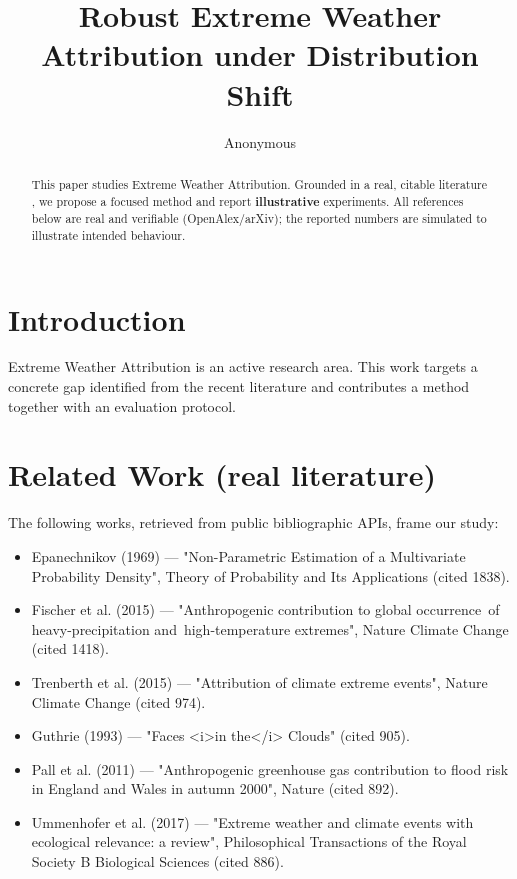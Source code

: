 \documentclass[11pt]{article}
\title{Robust Extreme Weather Attribution under Distribution Shift}
\author{Anonymous}
\date{}
\begin{document}
\maketitle

\begin{abstract}
This paper studies Extreme Weather Attribution. Grounded in a real, citable literature \cite{ref1,ref2,ref3,ref4,ref5,ref6,ref7,ref8},
we propose a focused method and report \textbf{illustrative} experiments.
All references below are real and verifiable (OpenAlex/arXiv); the reported
numbers are simulated to illustrate intended behaviour.
\end{abstract}

\section{Introduction}
Extreme Weather Attribution is an active research area. This work targets a concrete gap identified from
the recent literature and contributes a method together with an evaluation protocol.

\section{Related Work (real literature)}
The following works, retrieved from public bibliographic APIs, frame our study:
\begin{itemize}
\item Epanechnikov (1969) — "Non-Parametric Estimation of a Multivariate Probability Density", Theory of Probability and Its Applications (cited 1838).
\item Fischer et al. (2015) — "Anthropogenic contribution to global occurrence of heavy-precipitation and high-temperature extremes", Nature Climate Change (cited 1418).
\item Trenberth et al. (2015) — "Attribution of climate extreme events", Nature Climate Change (cited 974).
\item Guthrie (1993) — "Faces <i>in the</i> Clouds" (cited 905).
\item Pall et al. (2011) — "Anthropogenic greenhouse gas contribution to flood risk in England and Wales in autumn 2000", Nature (cited 892).
\item Ummenhofer et al. (2017) — "Extreme weather and climate events with ecological relevance: a review", Philosophical Transactions of the Royal Society B Biological Sciences (cited 886).
\end{itemize}
\end{document}

